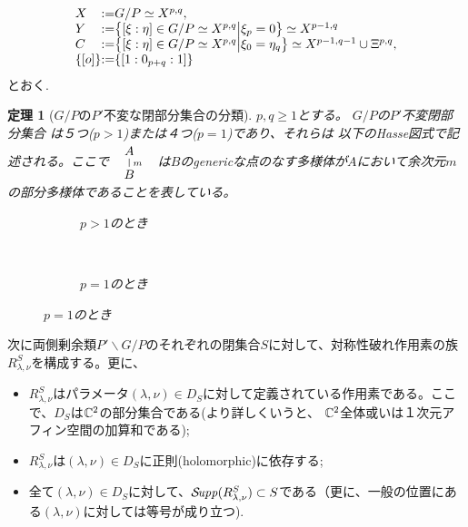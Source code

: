 \documentclass[12pt]{article} %
\newcommand{\Supp}{\mathcal{S}\!{\it upp}}
\newtheorem{theorem}{定理}
\theoremstyle{definition}
\theoremstyle{exampstyle} \newtheorem{examp}[theorem]{Theorem}
\begin{document}
\[\begin{array}{@{}l@{}l@{}l@{}}
X&:=&G/P\simeq X^{p,q},\\
Y&:=&\mysetn{[\xi:\eta]\in G/P\simeq X^{p,q}}{\xi_{p}=0}\simeq X^{p-1,q}\\
C&:=&\mysetn{[\xi:\eta]\in G/P\simeq X^{p,q}}{\xi_{0}=\eta_q}\simeq X^{p-1,q-1}\cup\Xi^{p,q},\\
\left\{ [o] \right\}&:=&\left\{ [1:0_{p+q}:1] \right\}
\end{array}\]
{とおく.}
\begin{theorem}[$G/P$の$P'$不変な閉部分集合の分類]
	$p,q\ge1$とする。
	$G/P$の$P'$不変閉部分集合
は５つ($p>1$){または}４つ($p=1$)であり、それらは
以下のHasse図式で記述される。ここで
	$
	\begin{array}{l}
	        \xymatrixrowsep{0.5pc}
		\xymatrix{A\ar@{-}[d]^m\\B}
	\end{array}
	$
	は$B$のgenericな点のなす多様体が$A$において余次元$m$の部分多様体であることを表している。\\
  \begin{figure}[H]
    \centering
    \begin{subfigure}[t]{0.3\textwidth}
	    \xymatrixrowsep{0.5pc}
	\caption{$p>1$のとき}
    \end{subfigure}
    ~ %
    \begin{subfigure}[t]{0.3\textwidth}
	    \xymatrixrowsep{0.5pc}
	    {}
	\caption{$p=1$のとき}
    \end{subfigure}
\end{figure}
\end{theorem}
次に両側剰余類$P'\backslash G/P$のそれぞれの閉集合$S$に対して、対称性破れ作用素の族$R^S_{\lambda,\nu}$を構成する。更に、
\begin{itemize}
	\item $R_{\lambda,\nu}^S$はパラメータ$(\lambda,\nu)\in D_S$に対して定義されている作用素である。ここで、$D_S$は$\mathbb{C}^2$の部分集合である(より詳しくいうと、
		$\mathbb{C}^2$全体或いは１次元アフィン空間の加算和である);
	\item $R_{\lambda,\nu}^S$は$(\lambda,\nu)\in D_S$に正則(holomorphic)に依存する;
	\item 全て$(\lambda,\nu)\in D_S$に対して、$\Supp(R_{\lambda,\nu}^S)\subset S$である（更に、一般の位置に{ある}$(\lambda,\nu)$に対しては{等号}が成り立つ).
\end{itemize}
\end{document}
